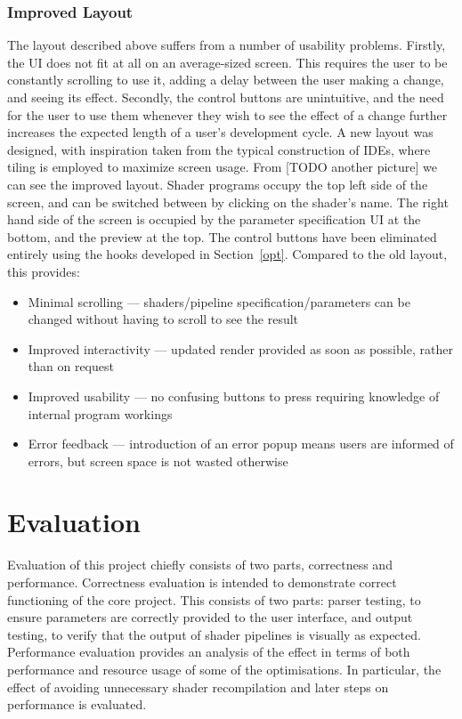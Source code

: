 \documentclass[12pt,twoside,notitlepage]{report}
\begin{document}
\subsection{Improved Layout}
The layout described above suffers from a number of usability problems. Firstly, the UI does not fit at all on an average-sized screen. This requires the user to be constantly scrolling to use it, adding a delay between the user making a change, and seeing its effect. Secondly, the control buttons are unintuitive, and the need for the user to use them whenever they wish to see the effect of a change further increases the expected length of a user's development cycle. A new layout was designed, with inspiration taken from the typical construction of IDEs, where tiling is employed to maximize screen usage. From [TODO another picture] we can see the improved layout. Shader programs occupy the top left side of the screen, and can be switched between by clicking on the shader's name. The right hand side of the screen is occupied by the parameter specification UI at the bottom, and the preview at the top. The control buttons have been eliminated entirely using the hooks developed in Section~\ref{opt}. Compared to the old layout, this provides:
\begin{itemize}
\item Minimal scrolling --- shaders/pipeline specification/parameters can be changed without having to scroll to see the result
\item Improved interactivity --- updated render provided as soon as possible, rather than on request
\item Improved usability --- no confusing buttons to press requiring knowledge of internal program workings 
\item Error feedback --- introduction of an error popup means users are informed of errors, but screen space is not wasted otherwise
\end{itemize}
\cleardoublepage
\chapter{Evaluation}
Evaluation of this project chiefly consists of two parts, correctness and performance. Correctness evaluation is intended to demonstrate correct functioning of the core project. This consists of two parts: parser testing, to ensure parameters are correctly provided to the user interface, and output testing, to verify that the output of shader pipelines is visually as expected. Performance evaluation provides an analysis of the effect in terms of both performance and resource usage of some of the optimisations. In particular, the effect of avoiding unnecessary shader recompilation and later steps on performance is evaluated.
\end{document}

